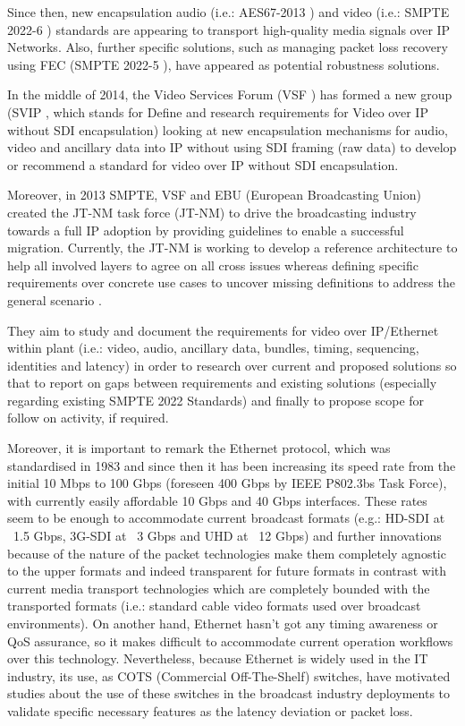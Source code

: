 Since then, new encapsulation audio (i.e.: AES67-2013 \cite{AES}) and video (i.e.: SMPTE 2022-6 \cite{ST2022}) standards are appearing to transport high-quality media signals over IP Networks. Also, further specific solutions, such as managing packet loss recovery using FEC (SMPTE 2022-5 \cite{ST20225}), have appeared as potential robustness solutions.

In the middle of 2014, the Video Services Forum (VSF \cite{VSF}) has formed a new group (SVIP \cite{SVIP}, which stands for Define and research requirements for Video over IP without SDI encapsulation) looking at new encapsulation mechanisms for audio, video and ancillary data into IP without using SDI framing (raw data) to develop or recommend a standard for video over IP without SDI encapsulation.

Moreover, in 2013 SMPTE, VSF and EBU (European Broadcasting Union) created the JT-NM task force (JT-NM) to drive the broadcasting industry towards a full IP adoption by providing guidelines to enable a successful migration. Currently, the JT-NM is working to develop a reference architecture to help all involved layers to agree on all cross issues whereas defining specific requirements over concrete use cases to uncover missing definitions to address the general scenario \cite{jtnm}.

They aim to study and document the requirements for video over IP/Ethernet within plant (i.e.: video, audio, ancillary data, bundles, timing, sequencing, identities and latency) in order to research over current and proposed solutions so that to report on gaps between requirements and existing solutions (especially regarding existing SMPTE 2022 Standards) and finally to propose scope for follow on activity, if required.

Moreover, it is important to remark the Ethernet \cite{eth} protocol, which was standardised in 1983 and since then it has been increasing its speed rate from the initial 10 Mbps to 100 Gbps (foreseen 400 Gbps by IEEE P802.3bs \cite{ethbs} Task Force), with currently easily affordable 10 Gbps and 40 Gbps interfaces. These rates seem to be enough to accommodate current broadcast formats (e.g.: HD-SDI at ~1.5 Gbps, 3G-SDI at ~3 Gbps and UHD at ~12 Gbps) and further innovations because of the nature of the packet technologies make them completely agnostic to the upper formats and indeed transparent for future formats in contrast with current media transport technologies which are completely bounded with the transported formats (i.e.: standard cable video formats used over broadcast environments). On another hand, Ethernet hasn't got any timing awareness or QoS assurance, so it makes difficult to accommodate current operation workflows over this technology. Nevertheless, because Ethernet is widely used in the IT industry, its use, as COTS (Commercial Off-The-Shelf) switches, have motivated studies about the use of these switches in the broadcast industry deployments to validate specific necessary features as the latency deviation or packet loss.

